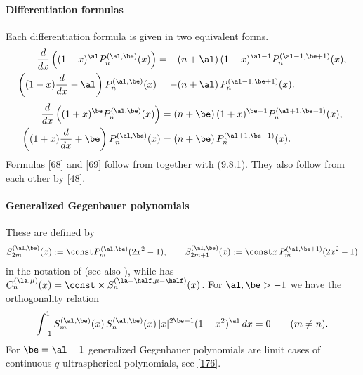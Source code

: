 \documentclass[envcountchap,graybox]{svmono}
\newcounter{rom}
\begin{document}
\paragraph{Differentiation formulas}
Each differentiation formula is given in two equivalent forms.
\begin{equation}
\begin{split}
\frac d{dx}\left((1-x)^\al P_n^{(\al,\be)}(x)\right)&=
-(n+\al)\,(1-x)^{\al-1} P_n^{(\al-1,\be+1)}(x),\\
\left((1-x)\frac d{dx}-\al\right)P_n^{(\al,\be)}(x)&=
-(n+\al)\,P_n^{(\al-1,\be+1)}(x).
\end{split}
\label{68}
\end{equation}
%
\begin{equation}
\begin{split}
\frac d{dx}\left((1+x)^\be P_n^{(\al,\be)}(x)\right)&=
(n+\be)\,(1+x)^{\be-1} P_n^{(\al+1,\be-1)}(x),\\
\left((1+x)\frac d{dx}+\be\right)P_n^{(\al,\be)}(x)&=
(n+\be)\,P_n^{(\al+1,\be-1)}(x).
\end{split}
\label{69}
\end{equation}
Formulas \eqref{68} and \eqref{69} follow from
together with (9.8.1). They also follow from each other by \eqref{48}.
%
\paragraph{Generalized Gegenbauer polynomials}
These are defined by
\begin{equation}
S_{2m}^{(\al,\be)}(x):=\const P_m^{(\al,\be)}(2x^2-1),\qquad
S_{2m+1}^{(\al,\be)}(x):=\const x\,P_m^{(\al,\be+1)}(2x^2-1)
\label{70}
\end{equation}
in the notation of 
(see also \cite{K27}), while \cite[Section 1.5.2]{K26}
has $C_n^{(\la,\mu)}(x)=\const\allowbreak\times S_n^{(\la-\half,\mu-\half)}(x)$.
For $\al,\be>-1$ we have the orthogonality relation
\begin{equation}
\int_{-1}^1 S_m^{(\al,\be)}(x)\,S_n^{(\al,\be)}(x)\,|x|^{2\be+1}(1-x^2)^\al\,dx
=0\qquad(m\ne n).
\label{71}
\end{equation}
For $\be=\al-1$ generalized Gegenbauer polynomials are limit cases of
continuous $q$-ultraspherical polynomials, see \eqref{176}.
\end{document}
